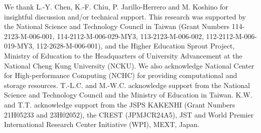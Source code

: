 \documentclass[reprint,
superscriptaddress,amsmath,amssymb,aps,prl]{revtex4-2}
\begin{document}
\begin{acknowledgments}
We thank L.-Y. Chen, K.-F. Chiu, P. Jarillo-Herrero and M. Koshino for insightful discussion and/or technical support. This research was supported by the National Science and Technology Council in Taiwan (Grant Numbers 114-2123-M-006-001, 114-2112-M-006-029-MY3, 113-2123-M-006-002,
112-2112-M-006-019-MY3, 112-2628-M-006-001), and the Higher Education Sprout Project, Ministry of Education to the Headquarters of University Advancement at the National Cheng Kung University (NCKU). We also acknowledge National Center for High-performance Computing (NCHC) for providing computational and storage resources. T.-L.C. and M.-W.C. acknowledge support from the National Science and Technology Council and the Ministry of Education in Taiwan. K.W. and T.T. acknowledge support from the JSPS KAKENHI (Grant Numbers 21H05233 and 23H02052), the CREST (JPMJCR24A5), JST and World Premier International Research Center Initiative (WPI), MEXT, Japan.

\end{acknowledgments}



\nocite{*}
\end{document}

